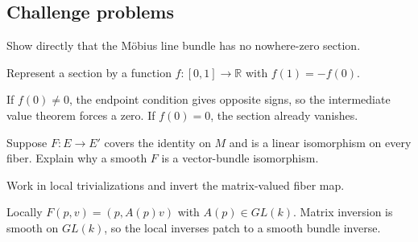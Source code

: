 \subsection*{Challenge problems}

\begin{exercise}\label{exr:vii07-ped-15}
Show directly that the Möbius line bundle has no nowhere-zero section.
\end{exercise}
\begin{hint}
Represent a section by a function \(f:[0,1]\to\mathbb R\) with \(f(1)=-f(0)\).
\end{hint}
\begin{solution}
If \(f(0)\neq0\), the endpoint condition gives opposite signs, so the intermediate value theorem forces a zero.  If \(f(0)=0\), the section already vanishes.
\end{solution}

\begin{exercise}\label{exr:vii07-ped-16}
Suppose \(F:E\to E'\) covers the identity on \(M\) and is a linear isomorphism on every fiber.  Explain why a smooth \(F\) is a vector-bundle isomorphism.
\end{exercise}
\begin{hint}
Work in local trivializations and invert the matrix-valued fiber map.
\end{hint}
\begin{solution}
Locally \(F(p,v)=(p,A(p)v)\) with \(A(p)\in GL(k)\).  Matrix inversion is smooth on \(GL(k)\), so the local inverses patch to a smooth bundle inverse.
\end{solution}

